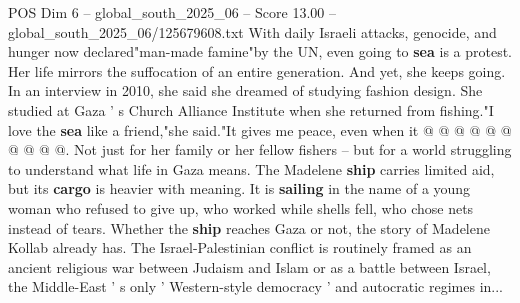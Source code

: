 \begin{textsample}{POS Dim 6 – global\_south\_2025\_06 – Score 13.00 – global\_south\_2025\_06/125679608.txt}
With daily Israeli attacks, genocide, and hunger now declared"man-made famine"by the UN, even going to \textbf{sea} is a protest.
Her life mirrors the suffocation of an entire generation.
And yet, she keeps going.
In an interview in 2010, she said she dreamed of studying fashion design.
She studied at Gaza ' s Church Alliance Institute when she returned from fishing."I love the \textbf{sea} like a friend,"she said."It gives me peace, even when it @ @ @ @ @ @ @ @ @ @.
Not just for her family or her fellow fishers -- but for a world struggling to understand what life in Gaza means.
The Madelene \textbf{ship} carries limited aid, but its \textbf{cargo} is heavier with meaning.
It is \textbf{sailing} in the name of a young woman who refused to give up, who worked while shells fell, who chose nets instead of tears.
Whether the \textbf{ship} reaches Gaza or not, the story of Madelene Kollab already has.
The Israel-Palestinian conflict is routinely framed as an ancient religious war between Judaism and Islam or as a battle between Israel, the Middle-East ' s only ' Western-style democracy ' and autocratic regimes in...

\end{textsample}
